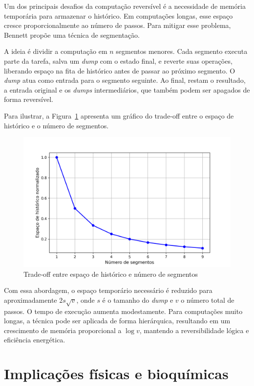 \documentclass[conference]{IEEEtran}
\begin{document}
Um dos principais desafios da computação reversível é a necessidade de memória temporária para armazenar o histórico. Em computações longas, esse espaço cresce proporcionalmente ao número de passos. Para mitigar esse problema, Bennett propõe uma técnica de segmentação.

A ideia é dividir a computação em $n$ segmentos menores. Cada segmento executa parte da tarefa, salva um \emph{dump} com o estado final, e reverte suas operações, liberando espaço na fita de histórico antes de passar ao próximo segmento. O \emph{dump} atua como entrada para o segmento seguinte. Ao final, restam o resultado, a entrada original e os \emph{dumps} intermediários, que também podem ser apagados de forma reversível.

Para ilustrar, a Figura~\ref{fig:tradeoff} apresenta um gráfico do trade‑off entre o espaço de histórico e o número de segmentos.

\begin{figure}[ht]
\centering
\includegraphics[width=1\linewidth]{space_time_tradeoff.png}
\caption{Trade‑off entre espaço de histórico e número de segmentos}
\label{fig:tradeoff}
\end{figure}

Com essa abordagem, o espaço temporário necessário é reduzido para aproximadamente $2s\sqrt{v}$, onde $s$ é o tamanho do \emph{dump} e $v$ o número total de passos. O tempo de execução aumenta modestamente. Para computações muito longas, a técnica pode ser aplicada de forma hierárquica, resultando em um crescimento de memória proporcional a $\log v$, mantendo a reversibilidade lógica e eficiência energética.

\section{Implicações físicas e bioquímicas}
\end{document}
